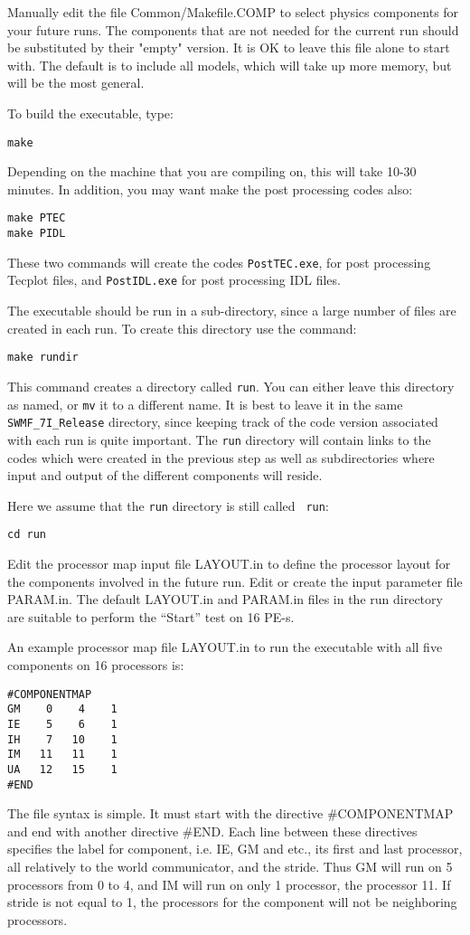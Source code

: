 Manually edit the file Common/Makefile.COMP to select physics
components for your future runs. The components that are not needed
for the current run should be substituted by their "empty" version.
It is OK to leave this file alone to start with.  The default is to
include all models, which will take up more memory, but will be the
most general.

To build the executable, type:
\begin{verbatim}
make
\end{verbatim} 
Depending on the machine that you are compiling on, this will take
10-30 minutes.  In addition, you may want make the post processing
codes also:
\begin{verbatim}
make PTEC
make PIDL
\end{verbatim} 
These two commands will create the codes {\tt PostTEC.exe}, for post
processing Tecplot files, and {\tt PostIDL.exe} for post processing
IDL files.

The executable should be run in a sub-directory, since a large number
of files are created in each run.  To create this directory use the
command:
\begin{verbatim}
make rundir
\end{verbatim} 
This command creates a directory called {\tt run}.  You can either
leave this directory as named, or {\tt mv} it to a different name.  It
is best to leave it in the same {\tt SWMF\_7I\_Release} directory, since
keeping track of the code version associated with each run is quite
important.  The {\tt run} directory will contain links to the codes
which were created in the previous step as well as subdirectories
where input and output of the different components will reside.

Here we assume that the {\tt run} directory is still called {\tt
run}:
\begin{verbatim}
cd run
\end{verbatim} 
Edit the processor map input file LAYOUT.in to define the processor
layout for the components involved in the future run.  Edit or create
the input parameter file PARAM.in.  The default LAYOUT.in and PARAM.in
files in the run directory are suitable to perform the ``Start'' test
on 16 PE-s.

An example processor map file LAYOUT.in to run the executable with
all five components on 16 processors is:
\begin{verbatim}
#COMPONENTMAP
GM    0    4    1
IE    5    6    1
IH    7   10    1
IM   11   11    1
UA   12   15    1
#END
\end{verbatim}
The file syntax is simple. It must start with the directive
\#COMPONENTMAP and end with another directive \#END. Each line between
these directives specifies the label for component, i.e. IE, GM and
etc., its first and last processor, all relatively to the world
communicator, and the stride. Thus GM will run on 5 processors from 0
to 4, and IM will run on only 1 processor, the processor 11.  If
stride is not equal to 1, the processors for the component will not be
neighboring processors.

